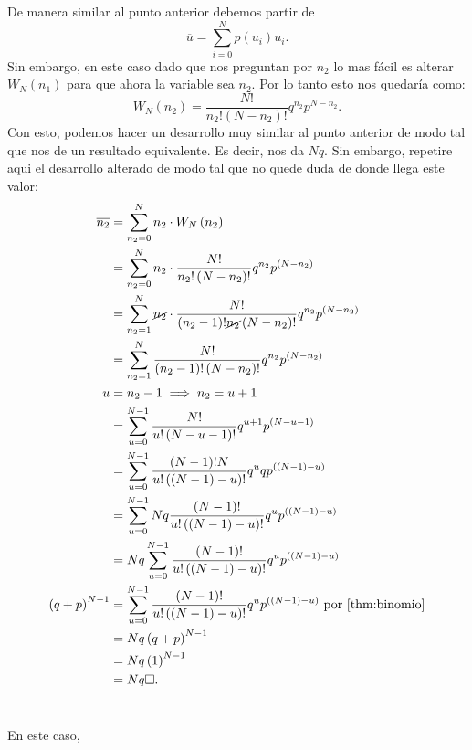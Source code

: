 \documentclass{report}
\begin{document}
De manera similar al punto anterior debemos partir de \[
\overline{u} = \sum_{i=0}^{N} p\left( u_i \right) u_i
.\] 
Sin embargo, en este caso dado que nos preguntan por $n_2$ lo mas fácil es alterar $W_N\left( n_1 \right) $ para que ahora la variable sea $n_2$. Por lo tanto esto nos quedaría como: \[
W_N\left( n_2 \right) = \frac{N!}{n_2!\left( N - n_2 \right)!}q^{n_2}p^{N - n_2}
.\] Con esto, podemos hacer un desarrollo muy similar al punto anterior de modo tal que nos de un resultado equivalente. Es decir, nos da $Nq$.
Sin embargo, repetire aqui el desarrollo alterado de modo tal que no quede duda de donde llega este valor:
\begin{align*}
  \overline{n_2} &= \sum_{n_2=0}^{N} n_2 \cdot  W_N\left( n_2 \right) \\
  &= \sum_{n_2 = 0}^{N} n_2 \cdot  \frac{N!}{n_2!\left( N - n_2 \right)!}q^{n_2}p^{\left( N - n_2 \right) } \\
  &= \sum_{n_2 = 1}^{N} \cancel{n_2} \cdot \frac{N!}{\left( n_2 - 1 \right)! \cancel{n_2} \left( N - n_2 \right)!}q^{n_2}p^{\left( N - n_2 \right) } \\
  &= \sum_{n_2 = 1}^{N} \frac{N!}{\left( n_2 - 1 \right)! \left( N - n_2 \right)!}q^{n_2}p^{\left( N - n_2 \right) } \\
  u &= n_2 - 1 \implies n_2 = u + 1 \\
  &= \sum_{u = 0}^{N - 1} \frac{N!}{u! \left( N - u - 1 \right)! } q^{u + 1} p^{\left( N - u - 1 \right) }\\
  &= \sum_{u = 0}^{N - 1} \frac{\left( N - 1 \right) ! N}{u! \left( \left( N - 1 \right) - u \right)!}q^{u}qp^{\left( \left( N - 1 \right) - u \right) } \\
  &= \sum_{u = 0}^{N - 1} Nq \frac{\left( N - 1 \right)!}{u! \left( \left( N - 1 \right) - u \right)! }q^{u}p^{\left( \left( N - 1 \right) - u \right) } \\
  &= Nq \sum_{u = 0}^{N - 1} \frac{\left( N - 1 \right)!}{u! \left( \left( N - 1 \right) - u \right)! }q^{u}p^{\left( \left( N - 1 \right) - u \right) } \\
  \left( q + p \right)^{N - 1} &= \sum_{u = 0}^{N - 1} \frac{\left( N - 1 \right)!}{u! \left( \left( N - 1 \right) - u \right)! }q^{u}p^{\left( \left( N - 1 \right) - u \right) } \text{ por \ref{thm:binomio}} \\
  &= Nq \left( q + p \right)^{N - 1} \\
  &= Nq \left( 1 \right)^{N - 1} \\
  &= Nq \square
.\end{align*}

\section{}

En este caso, 
\end{document}
